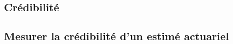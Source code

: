 \documentclass[10pt, french]{article}
\begin{document}
\begin{multicols*}{2}






\section{Crédibilité}

\subsection{Mesurer la crédibilité d'un estimé actuariel}







\end{multicols*}
\end{document}
